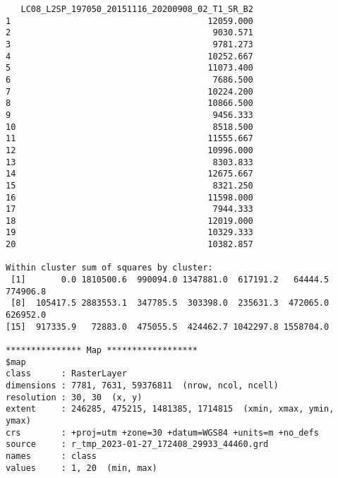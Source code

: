 \begin{scriptsize}
\begin{verbatim}
   LC08_L2SP_197050_20151116_20200908_02_T1_SR_B2
1                                       12059.000
2                                        9030.571
3                                        9781.273
4                                       10252.667
5                                       11073.400
6                                        7686.500
7                                       10224.200
8                                       10866.500
9                                        9456.333
10                                       8518.500
11                                      11555.667
12                                      10996.000
13                                       8303.833
14                                      12675.667
15                                       8321.250
16                                      11598.000
17                                       7944.333
18                                      12019.000
19                                      10329.333
20                                      10382.857

Within cluster sum of squares by cluster:
 [1]       0.0 1810500.6  990094.0 1347881.0  617191.2   64444.5  774906.8
 [8]  105417.5 2883553.1  347785.5  303398.0  235631.3  472065.0  626952.0
[15]  917335.9   72883.0  475055.5  424462.7 1042297.8 1558704.0

*************** Map ******************
$map
class      : RasterLayer 
dimensions : 7781, 7631, 59376811  (nrow, ncol, ncell)
resolution : 30, 30  (x, y)
extent     : 246285, 475215, 1481385, 1714815  (xmin, xmax, ymin, ymax)
crs        : +proj=utm +zone=30 +datum=WGS84 +units=m +no_defs 
source     : r_tmp_2023-01-27_172408_29933_44460.grd 
names      : class 
values     : 1, 20  (min, max)
\end{verbatim}
\end{scriptsize}